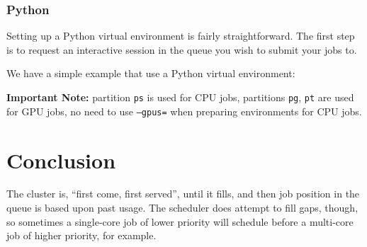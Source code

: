 \documentclass{easychair}
\begin{document}
\subsubsection{Python}
\label{sect:python-venv}

Setting up a Python virtual environment is fairly straightforward.
The first step is to request an interactive session in the queue you wish to submit your jobs to.

We have a simple example that use a Python virtual environment:


\noindent
\textbf{Important Note:} partition \texttt{ps} is used for CPU jobs, partitions \texttt{pg}, \texttt{pt} are used
for GPU jobs, no need to use \texttt{--gpus=} when preparing environments for CPU jobs.



\section{Conclusion}
\label{sect:conclusion}

The cluster is, ``first come, first served'', until it fills, and then job
position in the queue is based upon past usage. The scheduler does attempt
to fill gaps, though, so sometimes a single-core job of lower priority
will schedule before a multi-core job of higher priority, for example.
\end{document}
